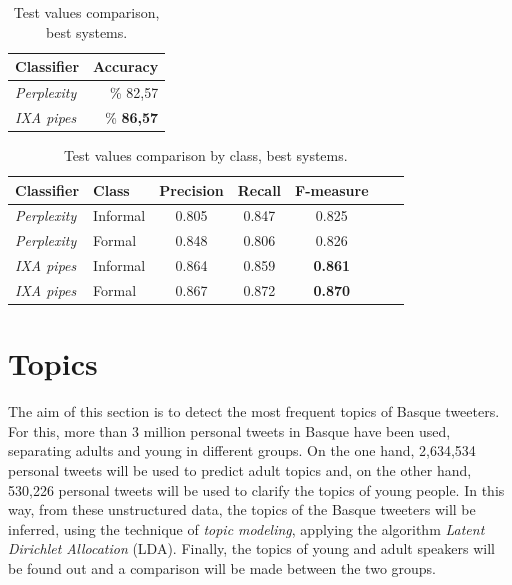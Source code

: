 \documentclass[information,article,submit,moreauthors,pdftex,10pt,a4paper]{Definitions/mdpi}
\begin{document}
\begin{table}[H]
  \centering
  \begin{tabular}{|l|r|}
    \hline
    \textbf{Classifier} & \textbf{Accuracy} \\ \hline 
    \textit{Perplexity} &  \% 82,57\\ \hline
    \textit{IXA pipes} &  \% \textbf{86,57}\\ \hline
  \end{tabular}
  \caption{Test values comparison, best systems.}
  \label{tab:acc-all}
\end{table}

\begin{table}[H]
  \centering
  \begin{tabular}{|l|l|c|c|c|c|c|}
    \hline
    \textbf{Classifier} & \textbf{Class} & \textbf{Precision} & \textbf{Recall} & \textbf{F-measure}\\ \hline 
    \textit{Perplexity} & Informal & 0.805  & 0.847  & 0.825\\ \hline 
    \textit{Perplexity} & Formal & 0.848 & 0.806 & 0.826\\ \hline
    \textit{IXA pipes} & Informal & 0.864  & 0.859  & \textbf{0.861}\\ \hline 
    \textit{IXA pipes} & Formal & 0.867 & 0.872 & \textbf{0.870}\\ \hline
  \end{tabular}
  \caption{Test values comparison by class, best systems.}
  \label{tab:test-all}
\end{table}



\section{Topics}\label{sec:topics}

The aim of this section is to detect the most frequent topics of Basque tweeters. For this, more than 3 million personal tweets in Basque have been used, separating adults and young in different groups. On the one hand, 2,634,534 personal tweets will be used to predict adult topics and, on the other hand, 530,226 personal tweets will be used to clarify the topics of young people. In this way, from these unstructured data, the topics of the Basque tweeters will be inferred, using the technique of \textit{topic modeling}, applying the algorithm \textit{Latent Dirichlet Allocation} (LDA). Finally, the topics of young and adult speakers will be found out and a comparison will be made between the two groups.
\end{document}
